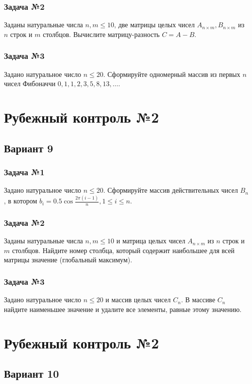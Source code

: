 \documentclass[12pt,a5paper,landscape]{report}
\begin{document}
\subsubsection*{Задача №2}
Заданы натуральные числа $n, m \le 10$, две матрицы целых чисел $A_{n \times m}, B_{n \times m}$ из $n$ строк и $m$ столбцов. Вычислите матрицу-разность $C = A - B$.
\subsubsection*{Задача №3}
Задано натуральное число $n \le 20$. Сформируйте одномерный массив из первых $n$ чисел Фибоначчи $0, 1, 1, 2, 3, 5, 8, 13, \ldots$.


\clearpage
\section*{Рубежный контроль №2}
\subsection*{Вариант 9}
\subsubsection*{Задача №1}
Задано натуральное число $n \le 20$. Сформируйте массив действительных чисел $B_n$, в котором $b_i = 0.5 \cos { \frac {2 \pi (i-1)} {n} }, 1 \le i \le n$.
\subsubsection*{Задача №2}
Заданы натуральные числа $n, m \le 10$ и матрица целых чисел $A_{n \times m}$ из $n$ строк и $m$ столбцов. Найдите номер столбца, который содержит наибольшее для всей матрицы значение (глобальный максимум).
\subsubsection*{Задача №3}
Задано натуральное число $n \le 20$ и массив целых чисел $C_n$. В массиве $C_n$ найдите наименьшее значение и удалите все элементы, равные этому значению.


\clearpage
\section*{Рубежный контроль №2}
\subsection*{Вариант 10}
\end{document}
